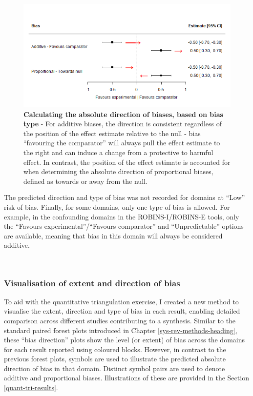 \documentclass[a4paper, twoside]{templates/ociamthesis}
\begin{document}
\begin{figure}[H]
\includegraphics[width=1\linewidth]{figures/tri/exampleDirection} \caption[Calculating the absolute direction of biases, based on bias type]{\textbf{Calculating the absolute direction of biases, based on bias type} - For additive biases, the direction is consistent regardless of the position of the effect estimate relative to the null - bias ``favouring the comparator'' will always pull the effect estimate to the right and can induce a change from a protective to harmful effect. In contrast, the position of the effect estimate is accounted for when determining the absolute direction of proportional biases, defined as towards or away from the null.}\label{fig:exampleDirection}
\end{figure}

The predicted direction and type of bias was not recorded for domains at ``Low'' risk of bias. Finally, for some domains, only one type of bias is allowed. For example, in the confounding domains in the ROBINS-I/ROBINS-E tools, only the ``Favours experimental''/``Favours comparator'' and ``Unpredictable'' options are available, meaning that bias in this domain will always be considered additive.

~

\hypertarget{visualisation-of-extent-and-direction-of-bias}{%
\subsubsection{Visualisation of extent and direction of bias}\label{visualisation-of-extent-and-direction-of-bias}}

To aid with the quantitative triangulation exercise, I created a new method to visualise the extent, direction and type of bias in each result, enabling detailed comparison across different studies contributing to a synthesis. Similar to the standard paired forest plots introduced in Chapter \ref{sys-rev-methods-heading}, these ``bias direction'' plots show the level (or extent) of bias across the domains for each result reported using coloured blocks. However, in contrast to the previous forest plots, symbols are used to illustrate the predicted absolute direction of bias in that domain. Distinct symbol pairs are used to denote additive and proportional biases. Illustrations of these are provided in the Section \ref{quant-tri-results}.
\end{document}

